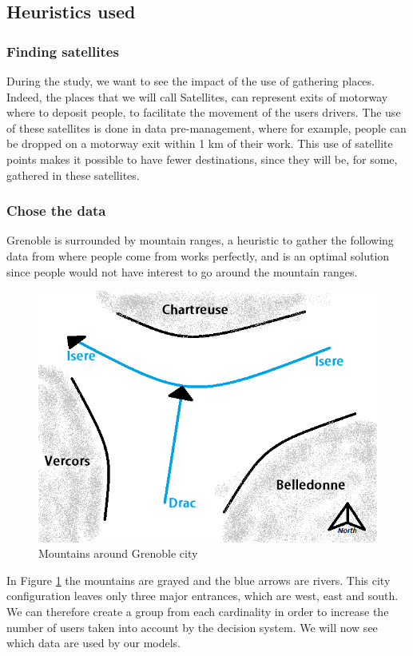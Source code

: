 \documentclass[12pt, a4paper, twoside]{memoir}
\newcommand{\newpar}{\vskip 0.2in \noindent}
\begin{document}
{	\subsection{Heuristics used}
	
	\subsubsection{Finding satellites}
	During the study, we want to see the impact of the use of gathering places. Indeed, the places that we will call Satellites, can represent exits of motorway where to deposit people, to facilitate the movement of the users drivers. \newline
	The use of these satellites is done in data pre-management, where for example, people can be dropped on a motorway exit within 1 km of their work.\newline
	This use of satellite points makes it possible to have fewer destinations, since they will be, for some, gathered in these satellites.
	
	\subsubsection{Chose the data}
	
	Grenoble is surrounded by mountain ranges, a heuristic to gather the following data from where people come from works perfectly, and is an optimal solution since people would not have interest to go around the mountain ranges.
	
	\begin{figure}[H]
		\centering
		\begin{flushleft}
			\includegraphics[scale=1]{img/i_grenoble.png}
		\end{flushleft}
		\caption{Mountains around Grenoble city}
		\label{fig:Mountains around Grenoble city}
	\end{figure}
	In Figure \ref{fig:Mountains around Grenoble city} the mountains are grayed and the blue arrows are rivers. This city configuration leaves only three major entrances, which are west, east and south. We can therefore create a group from each cardinality in order to increase the number of users taken into account by the decision system.
	\newpar
	We will now see which data are used by our models. 

}
\end{document}
